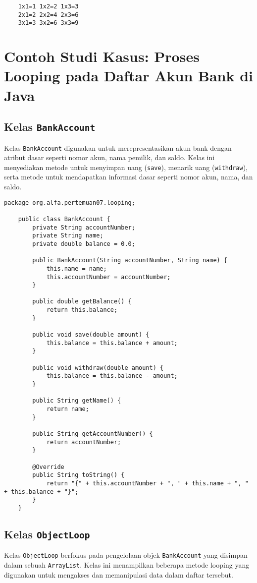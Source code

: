 \begin{verbatim}
	1x1=1 1x2=2 1x3=3 
	2x1=2 2x2=4 2x3=6 
	3x1=3 3x2=6 3x3=9 
\end{verbatim}


\section{Contoh Studi Kasus: Proses Looping pada Daftar Akun Bank di Java}

\subsection{Kelas \texttt{BankAccount}}
Kelas \texttt{BankAccount} digunakan untuk merepresentasikan akun bank dengan atribut dasar seperti nomor akun, nama pemilik, dan saldo. Kelas ini menyediakan metode untuk menyimpan uang (\texttt{save}), menarik uang (\texttt{withdraw}), serta metode untuk mendapatkan informasi dasar seperti nomor akun, nama, dan saldo.

\begin{lstlisting}[style=JavaStyle]
	package org.alfa.pertemuan07.looping;
	
	public class BankAccount {
		private String accountNumber;
		private String name;
		private double balance = 0.0;
		
		public BankAccount(String accountNumber, String name) {
			this.name = name;
			this.accountNumber = accountNumber;
		}
		
		public double getBalance() {
			return this.balance;
		}
		
		public void save(double amount) {
			this.balance = this.balance + amount;
		}
		
		public void withdraw(double amount) {
			this.balance = this.balance - amount;
		}
		
		public String getName() {
			return name;
		}
		
		public String getAccountNumber() {
			return accountNumber;
		}
		
		@Override
		public String toString() {
			return "{" + this.accountNumber + ", " + this.name + ", " + this.balance + "}";
		}
	}
\end{lstlisting}

\subsection{Kelas \texttt{ObjectLoop}}
Kelas \texttt{ObjectLoop} berfokus pada pengelolaan objek \texttt{BankAccount} yang disimpan dalam sebuah \texttt{ArrayList}. Kelas ini menampilkan beberapa metode looping yang digunakan untuk mengakses dan memanipulasi data dalam daftar tersebut.

